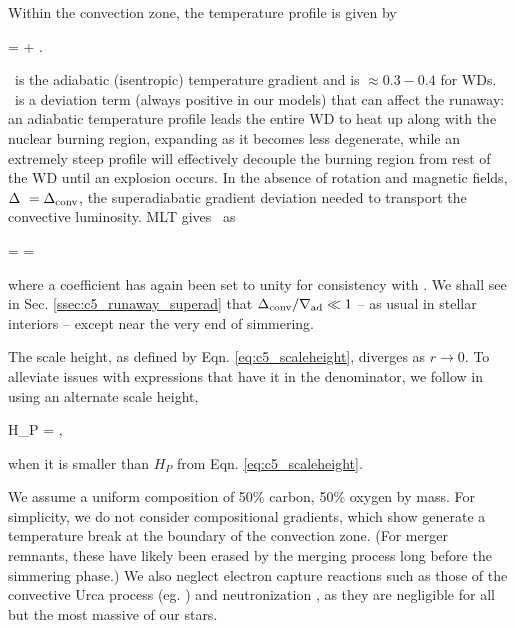 Within the convection zone, the temperature profile is given by

\eqbegin
\nabla \equiv {} = \nablaad + \deltanab.
\label{eq:c5_tempgrad}
\eqend

\noindent \nablaad\ is the adiabatic (isentropic) temperature gradient and is $\approx 0.3 -  0.4$ for WDs.  \deltanab\ is a deviation term (always positive in our models) that can affect the runaway: an adiabatic temperature profile leads the entire WD to heat up along with the nuclear burning region, expanding as it becomes less degenerate, while an extremely steep profile will effectively decouple the burning region from rest of the WD until an explosion occurs.  In the absence of rotation and magnetic fields, $\deltanab\ = \dnabconv$, the superadiabatic gradient deviation needed to transport the convective luminosity.  MLT gives \dnabconv\ as

\eqbegin
\dnabconv =  = 
\label{eq:c5_superad_dev}
\eqend

\noindent where a coefficient has again been set to unity for consistency with \citeal{piroc08}.  We shall see in Sec. \ref{ssec:c5_runaway_superad} that $\dnabconv/\nablaad \ll 1$ -- as usual in stellar interiors -- except near the very end of simmering.

The scale height, as defined by Eqn. \ref{eq:c5_scaleheight}, diverges as $r\rightarrow0$.  To alleviate issues with expressions that have it in the denominator, we follow \cite{paxt+11} in using an alternate scale height,

\eqbegin
H_P = ,
\eqend

\noindent when it is smaller than $H_P$ from Eqn. \ref{eq:c5_scaleheight}.

We assume a uniform composition of 50\% carbon, 50\% oxygen by mass.  For simplicity, we do not consider compositional gradients, which \citeal{piroc08} show generate a temperature break at the boundary of the convection zone.  (For merger remnants, these have likely been erased by the merging process long before the simmering phase.)  We also neglect electron capture reactions such as those of the convective Urca process (eg. \citealt{steiw06}) and neutronization \citep{pirob08}, as they are negligible for all but the most massive of our stars.  


